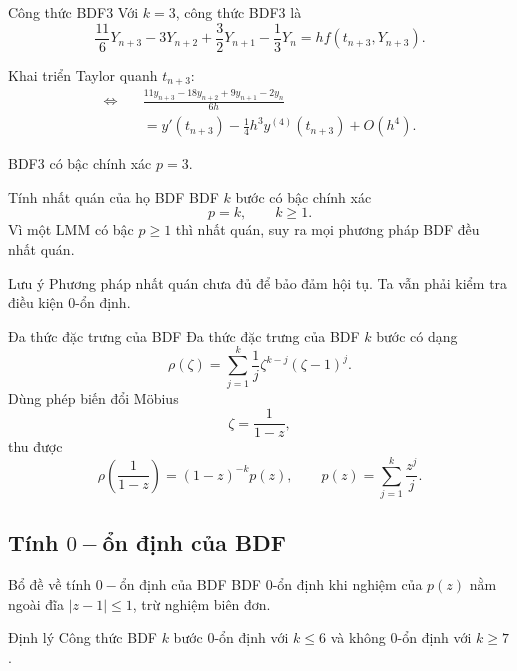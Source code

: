 \documentclass[aspectratio=43]{beamer}
\begin{document}
\begin{frame}
\begin{baitapbox}{Công thức BDF3}
Với $k=3$, công thức BDF3 là
\[
 \frac{11}{6}Y_{n+3}-3Y_{n+2}+
 \frac{3}{2}Y_{n+1}-\frac{1}{3}Y_n
 =hf(t_{n+3},Y_{n+3}).
\]

Khai triển Taylor quanh $t_{n+3}$:
\begin{align*}
    \Leftrightarrow \quad & \frac{11y_{n+3} - 18y_{n+2} + 9y_{n+1} - 2y_n}{6h} \\
    &= y'(t_{n+3}) - \frac{1}{4}h^3y^{(4)}(t_{n+3}) + O(h^4).
\end{align*}

\end{baitapbox}
\begin{tcolorbox}[title={Kết luận}, colback=softgreen, colframe=tealgreen, colbacktitle=tealgreen]
BDF3 có bậc chính xác $p=3$.
\end{tcolorbox}
\end{frame}

\begin{frame}
\begin{baitapbox}{Tính nhất quán của họ BDF}
BDF $k$ bước có bậc chính xác
\[
 p=k,
 \qquad k\ge1.
\]
Vì một LMM có bậc $p\ge1$ thì nhất quán, suy ra mọi phương pháp BDF đều nhất quán.
\end{baitapbox}
\begin{luuy}{Lưu ý}
Phương pháp nhất quán chưa đủ để bảo đảm hội tụ. Ta vẫn phải kiểm tra điều kiện 0-ổn định.
\end{luuy}
\end{frame}

\begin{frame}
\begin{baitapbox}{Đa thức đặc trưng của BDF}
Đa thức đặc trưng của BDF $k$ bước có dạng
\[
 \rho(\zeta)=\sum_{j=1}^{k}\frac{1}{j}\zeta^{k-j}(\zeta-1)^j.
\]
Dùng phép biến đổi Möbius
\[
 \zeta=\frac{1}{1-z},
\]
thu được
\[
 \rho\left(\frac{1}{1-z}\right)=(1-z)^{-k}p(z),
 \qquad
 p(z)=\sum_{j=1}^{k}\frac{z^j}{j}.
\]
\end{baitapbox}
\end{frame}
\subsection*{Tính $0-$ổn định của BDF}
\begin{frame}
\begin{baitapbox}{Bổ đề về tính $0-$ổn định của BDF}
BDF 0-ổn định khi nghiệm của $p(z)$ nằm ngoài đĩa $|z-1|\le1$, trừ nghiệm biên đơn.
\end{baitapbox}
\begin{baitapbox}{Định lý}
Công thức BDF $k$ bước 0-ổn định với $k\le6$ và không 0-ổn định với $k\ge7$.
\end{baitapbox}
\end{frame}
\end{document}
